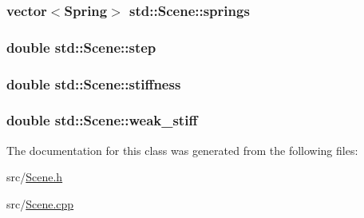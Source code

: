 \subsubsection[{springs}]{\setlength{\rightskip}{0pt plus 5cm}vector$<${\bf Spring}$>$ std\+::\+Scene\+::springs\hspace{0.3cm}{\ttfamily [private]}}\label{classstd_1_1Scene_a374f417dbcf99c8a314688460876283c}
\hypertarget{classstd_1_1Scene_aba3e53049dcf6b4fb7309a0fe6bb1e2d}{}
\subsubsection[{step}]{\setlength{\rightskip}{0pt plus 5cm}double std\+::\+Scene\+::step\hspace{0.3cm}{\ttfamily [private]}}\label{classstd_1_1Scene_aba3e53049dcf6b4fb7309a0fe6bb1e2d}
\hypertarget{classstd_1_1Scene_af694f3276a68d61649f9fabf2de017d2}{}
\subsubsection[{stiffness}]{\setlength{\rightskip}{0pt plus 5cm}double std\+::\+Scene\+::stiffness\hspace{0.3cm}{\ttfamily [private]}}\label{classstd_1_1Scene_af694f3276a68d61649f9fabf2de017d2}
\hypertarget{classstd_1_1Scene_a8b5958cd5f7a3f5f03ea8ec6042bceca}{}
\subsubsection[{weak\+\_\+stiff}]{\setlength{\rightskip}{0pt plus 5cm}double std\+::\+Scene\+::weak\+\_\+stiff\hspace{0.3cm}{\ttfamily [private]}}\label{classstd_1_1Scene_a8b5958cd5f7a3f5f03ea8ec6042bceca}


The documentation for this class was generated from the following files\+:\begin{DoxyCompactItemize}
\item 
src/\hyperlink{Scene_8h}{Scene.\+h}\item 
src/\hyperlink{Scene_8cpp}{Scene.\+cpp}\end{DoxyCompactItemize}

